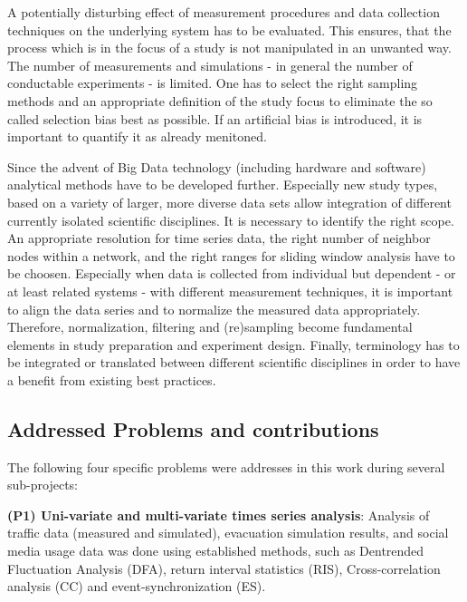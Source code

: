 \documentclass[a4paper,10pt]{scrbook}
\begin{document}
A potentially disturbing effect of measurement procedures and data collection techniques on the underlying system has to be evaluated. This ensures, that the process which is in the focus of a study is not manipulated in an unwanted way. The number of measurements and simulations - in general the number of conductable experiments - is limited. One has to select the right sampling methods and an appropriate definition of the study focus to eliminate the so
called selection bias best as possible. If an artificial bias is introduced, it is important to quantify it as already menitoned.

Since the advent of Big Data technology (including hardware and software) analytical methods have to be developed further. Especially new study types, based on a variety of larger, more diverse data sets allow integration of different currently isolated scientific disciplines. It is necessary to identify the right scope. An appropriate resolution for time series data, the right number of neighbor nodes within a network, and the right ranges for sliding window analysis have to be choosen. Especially when data is collected from individual but dependent - or at least related systems - with different measurement techniques, it is important to align the data series and to normalize the measured data appropriately. Therefore, normalization, filtering and (re)sampling become fundamental elements in study preparation and experiment design. Finally, terminology has to be integrated or translated between different scientific disciplines in order to have a benefit from existing best practices.

\subsection{Addressed Problems and contributions}
The following four specific problems were addresses in this work during several sub-projects:

\textbf{(P1) Uni-variate and multi-variate times series analysis}: Analysis of traffic data (measured and simulated), evacuation simulation results, and social media usage data was done using established methods, such as Dentrended Fluctuation Analysis (DFA), return interval statistics (RIS), Cross-correlation analysis (CC) and event-synchronization (ES).
\end{document}
